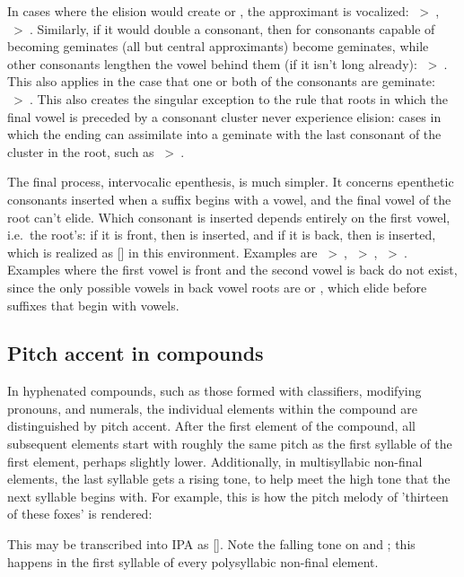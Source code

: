 In cases where the elision would create  or , the approximant
is vocalized: ~>~, ~>~. Similarly,
if it would double a consonant, then for consonants capable of becoming
geminates (all but central approximants) become geminates, while other
consonants lengthen the vowel behind them (if it isn't long already):
~>~. This also applies in the case that one or both of
the consonants are geminate: ~>~. This
also creates the singular exception to the rule that roots in which the final
vowel is preceded by a consonant cluster never experience elision: cases in
which the ending can assimilate into a geminate with the last consonant of the
cluster in the root, such as ~>~.

The final process, intervocalic epenthesis, is much simpler. It concerns
epenthetic consonants inserted when a suffix begins with a vowel, and the final
vowel of the root can't elide. Which consonant is inserted depends entirely on
the first vowel, i.e.~the root's: if it is front, then  is inserted, and
if it is back, then  is inserted, which is realized as [] in this
environment. Examples are ~>~,
~>~, ~>~. Examples where the
first vowel is front and the second vowel is back do not exist, since the only
possible vowels in back vowel roots are  or , which elide before
suffixes that begin with vowels.

\subsection{Pitch accent in compounds}\label{s:pitch-accent}
In hyphenated compounds, such as those formed with classifiers, modifying
pronouns, and numerals, the individual elements within the compound are
distinguished by pitch accent. After the first element of the compound, all
subsequent elements start with roughly the same pitch as the first syllable of
the first element, perhaps slightly lower. Additionally, in multisyllabic
non-final elements, the last syllable gets a rising tone, to help meet the high
tone that the next syllable begins with. For example, this is how the pitch
melody of  'thirteen of these foxes' is
rendered:

\begin{center}
\end{center}
\vspace{-1em}
\noindent This may be transcribed into IPA as [].
Note the falling tone on  and ; this happens in the first
syllable of every polysyllabic non-final element.
\pagebreak

